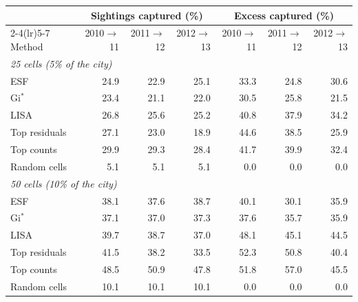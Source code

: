 \begin{tabular}{lrrrrrr}
\toprule
 & \multicolumn{3}{c}{Sightings captured (\%)} & \multicolumn{3}{c}{Excess captured (\%)} \\
\cmidrule(lr){2-4}\cmidrule(lr){5-7}
Method & 2010$\to$11 & 2011$\to$12 & 2012$\to$13 & 2010$\to$11 & 2011$\to$12 & 2012$\to$13 \\
\midrule
\multicolumn{7}{l}{\emph{25 cells (5\% of the city)}} \\
ESF & 24.9 & 22.9 & 25.1 & 33.3 & 24.8 & 30.6 \\
Gi$^*$ & 23.4 & 21.1 & 22.0 & 30.5 & 25.8 & 21.5 \\
LISA & 26.8 & 25.6 & 25.2 & 40.8 & 37.9 & 34.2 \\
Top residuals & 27.1 & 23.0 & 18.9 & 44.6 & 38.5 & 25.9 \\
Top counts & 29.9 & 29.3 & 28.4 & 41.7 & 39.9 & 32.4 \\
Random cells & 5.1 & 5.1 & 5.1 & 0.0 & 0.0 & 0.0 \\
\midrule
\multicolumn{7}{l}{\emph{50 cells (10\% of the city)}} \\
ESF & 38.1 & 37.6 & 38.7 & 40.1 & 30.1 & 35.9 \\
Gi$^*$ & 37.1 & 37.0 & 37.3 & 37.6 & 35.7 & 35.9 \\
LISA & 39.7 & 38.7 & 37.0 & 48.1 & 45.1 & 44.5 \\
Top residuals & 41.5 & 38.2 & 33.5 & 52.3 & 50.8 & 40.4 \\
Top counts & 48.5 & 50.9 & 47.8 & 51.8 & 57.0 & 45.5 \\
Random cells & 10.1 & 10.1 & 10.1 & 0.0 & 0.0 & 0.0 \\
\bottomrule
\end{tabular}
